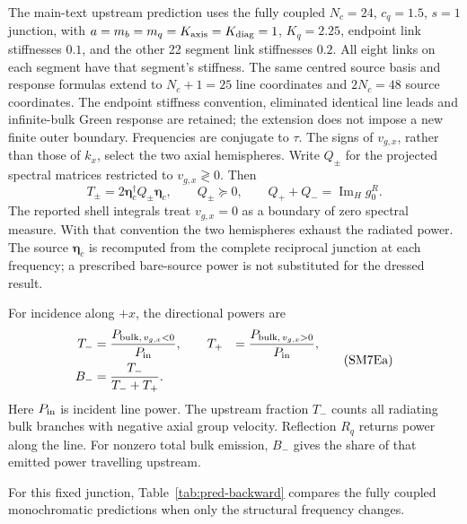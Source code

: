 \documentclass[10pt,aps,onecolumn,notitlepage,nofootinbib]{revtex4-2}
\newcommand{\veta}{\bm\eta}
\newcommand{\ImH}{\operatorname{Im}_{\!H}}
\begin{document}
The main-text upstream prediction uses the fully coupled $N_c=24$, $c_q=1.5$, $s=1$ junction, with $a=m_b=m_q=K_{\rm axis}=K_{\rm diag}=1$, $K_q=2.25$, endpoint link stiffnesses $0.1$, and the other 22 segment link stiffnesses $0.2$. All eight links on each segment have that segment's stiffness. The same centred source basis and response formulas extend to $N_c+1=25$ line coordinates and $2N_c=48$ source coordinates. The endpoint stiffness convention, eliminated identical line leads and infinite-bulk Green response are retained; the extension does not impose a new finite outer boundary. Frequencies are conjugate to $\tau$. The signs of $v_{g,x}$, rather than those of $k_x$, select the two axial hemispheres. Write $Q_\pm$ for the projected spectral matrices restricted to $v_{g,x}\gtrless0$. Then
\begin{equation}
 T_\pm=2\veta_c^\dagger Q_\pm\veta_c,
 \qquad Q_\pm\succeq0,
 \qquad Q_++Q_-=\ImH g_0^R.
 \label{eq:sm-pred-directional-power}
\end{equation}
The reported shell integrals treat $v_{g,x}=0$ as a boundary of zero spectral measure. With that convention the two hemispheres exhaust the radiated power. The source $\veta_c$ is recomputed from the complete reciprocal junction at each frequency; a prescribed bare-source power is not substituted for the dressed result.

For incidence along $+x$, the directional powers are
\begin{equation*}
 \begin{aligned}
 T_- &= \frac{P_{{\rm bulk},\,v_{g,x}<0}}{P_{\rm in}},
 \qquad
 T_+ &= \frac{P_{{\rm bulk},\,v_{g,x}>0}}{P_{\rm in}},
 \\
 B_- &= \frac{T_-}{T_-+T_+}.
 \end{aligned}
 \tag{SM7Ea}
 \label{eq:pred-backward-observables}
\end{equation*}
Here $P_{\rm in}$ is incident line power. The upstream fraction $T_-$ counts
all radiating bulk branches with negative axial group velocity. Reflection
$R_q$ returns power along the line. For nonzero total bulk emission,
$B_-$ gives the share of that emitted power travelling upstream.

For this fixed junction, Table~\ref{tab:pred-backward} compares the fully
coupled monochromatic predictions when only the structural frequency changes.
\end{document}
